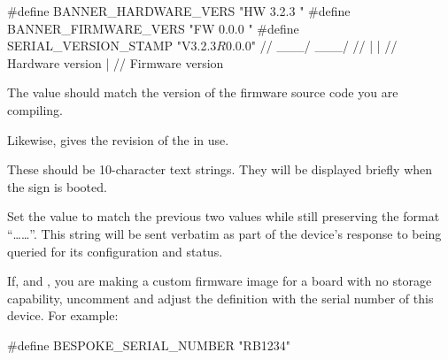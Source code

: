 \begin{SourceCode}
#define BANNER_HARDWARE_VERS "HW 3.2.3  "
#define BANNER_FIRMWARE_VERS "FW 0.0.0  "
#define SERIAL_VERSION_STAMP "V3.2.3$R0.0.0$"
//                             \___/  \___/
//                               |      |
//                  Hardware version    |
//                         Firmware version
\end{SourceCode}

The  value should match the version of the firm\-ware source code you are compiling.

Likewise,  gives the revision of the  in use.


These should be 10-character text strings. They will be displayed briefly when the sign is booted.

Set the  value to match the previous two values while still preserving
the format ``\dots{}\dots\z{\$}''. This string will be sent verbatim as part
of the device's response to being queried for its configuration and status.

%

If, and , you are making a custom firmware image for a board with no 
storage capability, uncomment and adjust the  definition with the serial
number of this device. For example:
\begin{SourceCode}
#define BESPOKE_SERIAL_NUMBER "RB1234"
\end{SourceCode}

